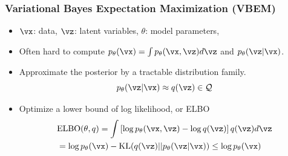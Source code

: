 \documentclass[16pt,presentation]{beamer}
\begin{document}
\begin{frame}
\frametitle{Variational Bayes Expectation Maximization (VBEM)}
\begin{itemize}
\item $\vx$: data, $\vz$: latent variables, $\theta$: model parameters, 
\item Often hard to compute $p_\theta(\vx) = \int p_\theta(\vx, \vz) d \vz$ and $p_\theta(\vz | \vx)$.
\item Approximate the posterior by a \alert{tractable} distribution family.
\[p_{\theta}(\vz | \vx) \approx q(\vz) \in \mathcal{Q}\]
\item Optimize a \alert{lower bound of log likelihood}, or ELBO %
\[\begin{split}
&\text{ELBO}(\theta, q) = \int \left[\log p_{\theta}(\vx, \vz) - \log q(\vz)\right] q(\vz) d\vz \\
&= \log p_{\theta}(\vx) - \text{KL}(q(\vz) || p_\theta(\vz | \vx)) \leq \log p_{\theta}(\vx) %
\end{split}\]
\end{itemize}
\end{frame}
\end{document}
